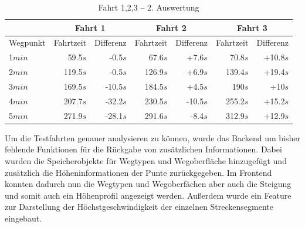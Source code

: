\begin{table}[htb]
\centering
\caption{Fahrt 1,2,3 -- 2. Auswertung}
\label{tab:all}
\begin{tabular}{|l|r|r|r|r|r|r|}
\hhline{~|-|-|-|-|-|-}
\multicolumn{1}{l|}{} & \multicolumn{2}{c|}{Fahrt 1} & \multicolumn{2}{c|}{Fahrt 2} & \multicolumn{2}{c|}{Fahrt 3} \\ \hline
Wegpunkt              & Fahrtzeit   & Differenz     & Fahrtzeit   & Differenz     & Fahrtzeit  & Differenz      \\ \hline 
1$min$                & 59.5$s$     & -0.5$s$        & 67.6$s$     & +7.6$s$        & 70.8$s$    & +10.8$s$        \\
2$min$                & 119.5$s$    & -0.5$s$        & 126.9$s$    & +6.9$s$        & 139.4$s$   & +19.4$s$        \\
3$min$                & 169.5$s$    & -10.5$s$       & 184.5$s$    & +4.5$s$        & 190$s$     & +10$s$          \\
4$min$                & 207.7$s$    & -32.2$s$       & 230.5$s$    & -10.5$s$       & 255.2$s$   & +15.2$s$        \\
5$min$                & 271.9$s$    & -28.1$s$       & 291.6$s$    & -8.4$s$        & 312.9$s$   & +12.9$s$        \\
\hline
\end{tabular}
\end{table}


Um die Testfahrten genauer analysieren zu können, wurde das Backend um bisher fehlende Funktionen für die Rückgabe von zusätzlichen Informationen.
Dabei wurden die Speicherobjekte für Wegtypen und Wegoberfläche hinzugefügt und zusätzlich die Höheninformationen der Punte zurückgegeben.
Im Frontend konnten dadurch nun die Wegtypen und Wegoberfächen aber auch die Steigung und somit auch ein Höhenprofil angezeigt werden.
Außerdem wurde ein Feature zur Darstellung der Höchstgeschwindigkeit der einzelnen Streckensegmente eingebaut.